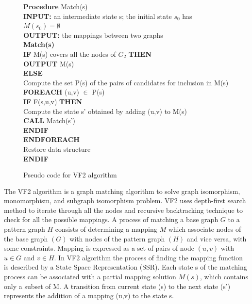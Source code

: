 \begin{figure}

\begin{algorithm}[H]
\begin{algorithmic}
 \LState  \textbf{Procedure} Match(s)\\
\textbf{INPUT:}  an intermediate state s; the initial state $s_0$ has $M(s_0)=\emptyset$\\
\textbf{OUTPUT:} the mappings between two graphs\\
\textbf{Match(s)}\\
 \textbf{IF} M(s) covers all the nodes of $G_2$ \textbf{THEN}\\
\quad \textbf{OUTPUT} M(s)\\
\textbf{ELSE}\\
 \quad    Compute the set P(s) of the pairs of candidates for inclusion in M(s)\\
\quad\textbf{FOREACH} (u,v) $\in$ P(s)\\
\quad\quad\textbf{IF} F(s,u,v) \textbf{THEN}\\
\quad\quad\quad    Compute the state s' obtained by adding (u,v) to M(s)\\
\quad\quad\quad\textbf{CALL} Match(s')\\
\quad\quad\textbf{ENDIF}\\
\quad\textbf{ENDFOREACH}\\
\quad Restore data structure\\
\textbf{ENDIF}\\

\end{algorithmic}
\end{algorithm}
\caption{Pseudo code for VF2 algorithm\cite{cordella2001improved}}
\label{fig:VF2}
\end{figure}


The VF2 algorithm is a graph matching algorithm to solve graph isomorphism, monomorphism, and  subgraph isomorphism problem. VF2 uses depth-first search method to iterate through all the nodes and recursive backtracking technique to check for all the possible mappings. A process of matching 
a base graph $G$ to a pattern graph $H$ consists of determining a mapping $M$ which associate nodes of the base graph $(G)$ with nodes of the pattern graph $(H)$ and vice versa, with some constraints.
Mapping is expressed as a set of pairs of node $(u,v)$ with $u \in G$ and $v \in H$. 
In VF2 algorithm the process of finding the mapping function is described by a  State Space Representation (SSR). Each state s of the matching process can be associated with a partial mapping solution $M(s)$,
which contains only a subset of M. A transition from current state (s) to the next state (s') represents the addition of a mapping (u,v) to the state s.


